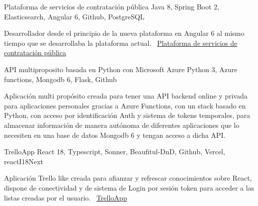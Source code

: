 \documentclass[]{awesome-cv}
\begin{document}
\begin{cventries}
	\vspace{-3mm}
	\cventry
	{}
	{Plataforma de servicios de contratación pública \vspace{-5mm}}
	{Java 8, Spring Boot 2, Elasticsearch, Angular 6, Github, PostgreSQL \vspace{-5mm}}
	{}
	{\begin{cvsectionnormaltext}
		\item{Desarrollador desde el principio de la nueva plataforma en Angular 6 al mismo tiempo que se desarrollaba la plataforma actual.
		\newline \faLink\ \href{https://contractaciopublica.cat/ca/inici}{Plataforma de servicios de contratación pública}}
	\end{cvsectionnormaltext}}

    \cventry
	{}
	{API multiproposito basada en Python con Microsoft Azure \vspace{-5mm}}
	{Python 3, Azure functions, Mongodb 6, Flask, Github \vspace{-5mm}}
	{}
	{\begin{cvsectionnormaltext}
		\item{Aplicación multi propósito creada para tener una API backend online y privada para aplicaciones personales gracias a Azure Functions, con un stack basado en Python, con acceso por identificación Auth y sistema de tokens temporales, para almacenar información de manera autónoma de diferentes aplicaciones que lo necesiten en una base de datos Mongodb 6 y tengan acceso a dicha API.
		\newline}
	\end{cvsectionnormaltext}}

    \cventry
	{}
	{TrelloApp \vspace{-5mm}}
	{React 18, Typescript, Sonner, Beaufitul-DnD, Github, Vercel, reactI18Next \vspace{-5mm}}
	{}
	{\begin{cvsectionnormaltext}
		\item{Aplicación Trello like creada para afianzar y refrescar conocimientos sobre React, dispone de conectividad y de sistema de Login por sesión token para acceder a las listas creadas por el usuario.
		\newline \faLink\ \href{https://trello-app-giacconidev.vercel.app/user/login}{TrelloApp}}
	\end{cvsectionnormaltext}}
 
	\vspace{-5mm}
\end{cventries}
\end{document}
